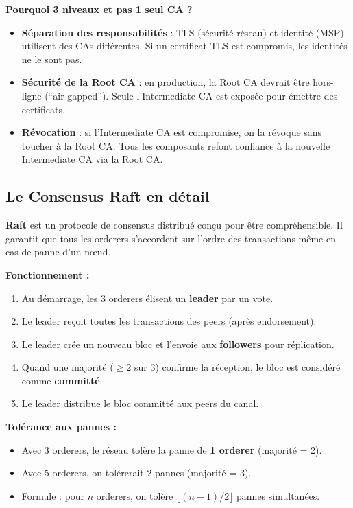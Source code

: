 \documentclass[12pt,a4paper,twoside]{report}
\begin{document}
\begin{warningbox}
\textbf{Pourquoi 3 niveaux et pas 1 seul CA ?}
\begin{itemize}
    \item \textbf{Séparation des responsabilités} : TLS (sécurité réseau) et identité (MSP) utilisent des CAs différentes. Si un certificat TLS est compromis, les identités ne le sont pas.
    \item \textbf{Sécurité de la Root CA} : en production, la Root CA devrait être hors-ligne (``air-gapped''). Seule l'Intermediate CA est exposée pour émettre des certificats.
    \item \textbf{Révocation} : si l'Intermediate CA est compromise, on la révoque sans toucher à la Root CA. Tous les composants refont confiance à la nouvelle Intermediate CA via la Root CA.
\end{itemize}
\end{warningbox}

\subsection{Le Consensus Raft en détail}

\textbf{Raft} est un protocole de consensus distribué conçu pour être compréhensible. Il garantit que tous les orderers s'accordent sur l'ordre des transactions même en cas de panne d'un nœud.

\textbf{Fonctionnement :}
\begin{enumerate}
    \item Au démarrage, les 3 orderers élisent un \textbf{leader} par un vote.
    \item Le leader reçoit toutes les transactions des peers (après endorsement).
    \item Le leader crée un nouveau bloc et l'envoie aux \textbf{followers} pour réplication.
    \item Quand une majorité ($\geq 2$ sur 3) confirme la réception, le bloc est considéré comme \textbf{committé}.
    \item Le leader distribue le bloc committé aux peers du canal.
\end{enumerate}

\textbf{Tolérance aux pannes :}
\begin{itemize}
    \item Avec 3 orderers, le réseau tolère la panne de \textbf{1 orderer} (majorité = 2).
    \item Avec 5 orderers, on tolérerait 2 pannes (majorité = 3).
    \item Formule : pour $n$ orderers, on tolère $\lfloor (n-1)/2 \rfloor$ pannes simultanées.
\end{itemize}
\end{document}
